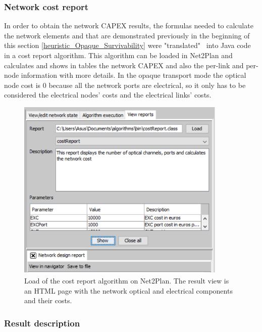 \subsubsection{Network cost report}

\vspace{11pt}
In order to obtain the network CAPEX results, the formulas needed to calculate the network elements and that are demonstrated previously in the beginning of this section \ref{heuristic_Opaque_Survivability} were "translated" \ into Java code in a cost report algorithm. This algorithm can be loaded in Net2Plan and calculates and shows in tables the network CAPEX and also the per-link and per-node information with more details.
In the opaque transport mode the optical node cost is 0 because all the network ports are electrical, so it only has to be considered the electrical nodes' costs and the electrical links' costs.

\begin{figure}[H]
\centering
\includegraphics[width=10cm]{sdf/heuristic/opaque_survivability/figures/cost_report_opaque}
\caption{Load of the cost report algorithm on Net2Plan. The result view is an HTML page with the network optical and electrical components and their costs.}
\label{cost_report_opaque_opaque_surv}
\end{figure}

\newpage
\subsubsection{Result description}\label{result_description_opaque_heuristic_surv}

